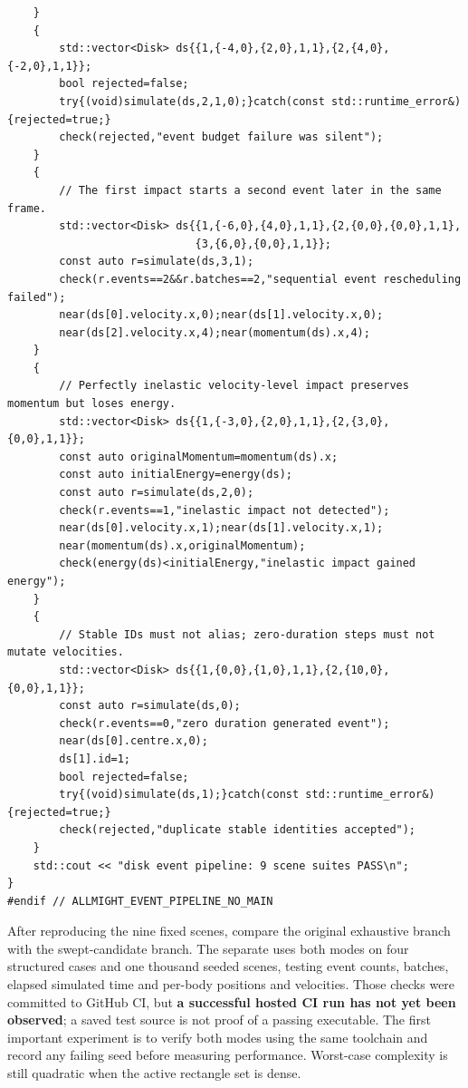 \begin{verbatim}
    }
    {
        std::vector<Disk> ds{{1,{-4,0},{2,0},1,1},{2,{4,0},{-2,0},1,1}};
        bool rejected=false;
        try{(void)simulate(ds,2,1,0);}catch(const std::runtime_error&){rejected=true;}
        check(rejected,"event budget failure was silent");
    }
    {
        // The first impact starts a second event later in the same frame.
        std::vector<Disk> ds{{1,{-6,0},{4,0},1,1},{2,{0,0},{0,0},1,1},
                             {3,{6,0},{0,0},1,1}};
        const auto r=simulate(ds,3,1);
        check(r.events==2&&r.batches==2,"sequential event rescheduling failed");
        near(ds[0].velocity.x,0);near(ds[1].velocity.x,0);
        near(ds[2].velocity.x,4);near(momentum(ds).x,4);
    }
    {
        // Perfectly inelastic velocity-level impact preserves momentum but loses energy.
        std::vector<Disk> ds{{1,{-3,0},{2,0},1,1},{2,{3,0},{0,0},1,1}};
        const auto originalMomentum=momentum(ds).x;
        const auto initialEnergy=energy(ds);
        const auto r=simulate(ds,2,0);
        check(r.events==1,"inelastic impact not detected");
        near(ds[0].velocity.x,1);near(ds[1].velocity.x,1);
        near(momentum(ds).x,originalMomentum);
        check(energy(ds)<initialEnergy,"inelastic impact gained energy");
    }
    {
        // Stable IDs must not alias; zero-duration steps must not mutate velocities.
        std::vector<Disk> ds{{1,{0,0},{1,0},1,1},{2,{10,0},{0,0},1,1}};
        const auto r=simulate(ds,0);
        check(r.events==0,"zero duration generated event");
        near(ds[0].centre.x,0);
        ds[1].id=1;
        bool rejected=false;
        try{(void)simulate(ds,1);}catch(const std::runtime_error&){rejected=true;}
        check(rejected,"duplicate stable identities accepted");
    }
    std::cout << "disk event pipeline: 9 scene suites PASS\n";
}
#endif // ALLMIGHT_EVENT_PIPELINE_NO_MAIN
\end{verbatim}

After reproducing the nine fixed scenes, compare the original exhaustive branch with the swept-candidate branch. The separate  uses both modes on four structured cases and one thousand seeded scenes, testing event counts, batches, elapsed simulated time and per-body positions and velocities. Those checks were committed to GitHub CI, but \textbf{a successful hosted CI run has not yet been observed}; a saved test source is not proof of a passing executable. The first important experiment is to verify both modes using the same toolchain and record any failing seed before measuring performance. Worst-case complexity is still quadratic when the active rectangle set is dense.

